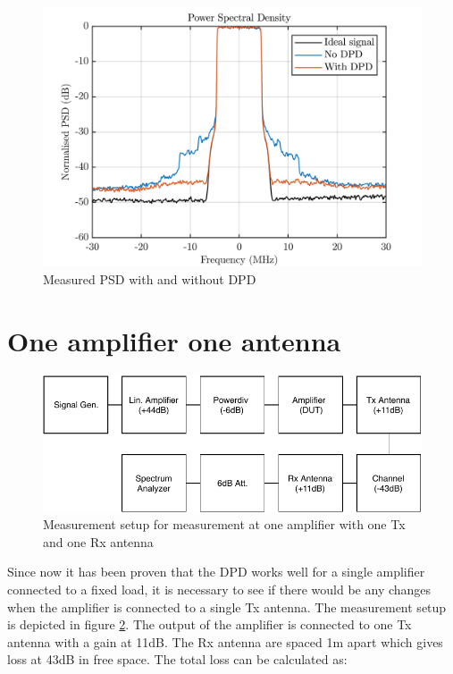 \begin{figure}[H]
\centering 
\includegraphics[scale = 0.7]{figures/measurement/cree/meas1/PSD_1.png}
\caption{Measured PSD with and without DPD}
\label{fig:meas_amp_PSD}
\end{figure}

\section{One amplifier one antenna}

\begin{figure}[H]
\centering 
\includegraphics[scale = 0.9]{figures/measurement/cree/meas2/meas2.pdf}
\caption{Measurement setup for measurement at one amplifier with one Tx and one Rx antenna}
\label{fig:meas_amp2}
\end{figure}

Since now it has been proven that the DPD works well for a single amplifier connected to a fixed load, it is necessary to see if there would be any changes when the amplifier is connected to a single Tx antenna. The measurement setup is depicted in figure \ref{fig:meas_amp2}. The output of the amplifier is connected to one Tx antenna with a gain at 11dB. The Rx antenna are spaced 1m apart which gives loss at 43dB in free space. The total loss can be calculated as:

